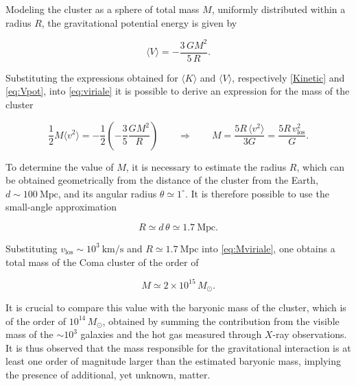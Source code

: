 Modeling the cluster as a sphere of total mass $M$, uniformly distributed within a radius $R$, the gravitational potential energy is given by

\begin{equation}\label{eq:Vpot}
    \langle V\rangle = -\frac{3\,G M^{2}}{5\,R}.
\end{equation}

Substituting the expressions obtained for $\langle K \rangle$ and $\langle V \rangle$, respectively \cref{Kinetic} and \cref{eq:Vpot}, into \cref{eq:viriale} it is possible to derive an expression for the mass of the cluster

\begin{equation}
\frac{1}{2}M\langle v^{2}\rangle
=
-\frac{1}{2}\!\left(-\frac{3}{5}\frac{GM^{2}}{R}\right)
\qquad\Rightarrow\qquad
M=\frac{5R\,\langle v^{2}\rangle}{3G}
=\frac{5R\,v_{\text{los}}^{2}}{G}.
\label{eq:Mviriale}
\end{equation}

To determine the value of $M$, it is necessary to estimate the radius $R$, which can be obtained geometrically from the distance of the cluster from the Earth, $d \sim 100~\mathrm{Mpc}$, and its angular radius $\theta \simeq 1^\circ$. 
It is therefore possible to use the small-angle approximation

\begin{equation}
R \simeq d\,\theta \simeq 1.7\ \text{Mpc}.
\end{equation}

Substituting $v_{\mathrm{los}} \sim 10^{3}~\mathrm{km/s}$ and $R \simeq 1.7~\mathrm{Mpc}$ into \cref{eq:Mviriale}, one obtains a total mass of the Coma cluster of the order of

\begin{equation}
M  \simeq 2 \times 10^{15}\,M_{\odot}.
\end{equation}


It is crucial to compare this value with the baryonic mass of the cluster, which is of the order of $10^{14}\,M_{\odot}$, obtained by summing the contribution from the visible mass of the $\sim 10^3$ galaxies and the hot gas measured through $X$-ray observations.
It is thus observed that the mass responsible for the gravitational interaction is at least one order of magnitude larger than the estimated baryonic mass, implying the presence of additional, yet unknown, matter.


